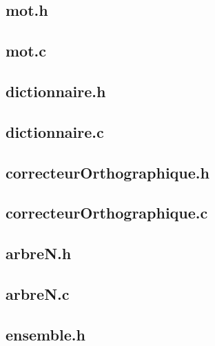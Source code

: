 
\subsection{mot.h}

\bigskip

\subsection{mot.c}

\bigskip

\subsection{dictionnaire.h}

\bigskip

\subsection{dictionnaire.c}

\bigskip

\subsection{correcteurOrthographique.h}

\bigskip

\subsection{correcteurOrthographique.c}

\bigskip

\subsection{arbreN.h}

\bigskip

\subsection{arbreN.c}

\bigskip

\subsection{ensemble.h}

\bigskip

